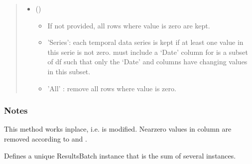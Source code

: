 \documentclass[letterpaper,10pt,english]{sphinxmanual}
\begin{document}
\begin{fulllineitems}
\begin{fulllineitems}
\begin{quote}
\begin{description}
\begin{itemize}
\item {} 
\sphinxAtStartPar
{} (\sphinxstyleliteralemphasis{\sphinxupquote{, }}\sphinxstyleliteralemphasis{\sphinxupquote{, }}) \textendash{} \begin{itemize}
\item {} 
\sphinxAtStartPar
If not provided, all rows where  value is zero are kept.

\item {} 
\sphinxAtStartPar
’Series’: each temporal data series is kept if at least one value in this serie is not zero.
 must include a ‘Date’ column for  is a subset of df such that only the ‘Date’ and  columns
have changing values in this subset.

\item {} 
\sphinxAtStartPar
’All’ : remove all rows where  value is zero.

\end{itemize}


\end{itemize}

\end{description}\end{quote}
\subsubsection*{Notes}

\sphinxAtStartPar
This method works inplace, i.e.  is modified.
Near\sphinxhyphen{}zero values in column  are removed according to  and .

\end{fulllineitems}


\begin{fulllineitems}
\label{\detokenize{generated/tamos.data_IO.ResultsBatch:tamos.data_IO.ResultsBatch.sum}}
\pysigstartsignatures
{}
\pysigstopsignatures
\sphinxAtStartPar
Defines a unique ResultsBatch instance that is the sum of several instances.


\end{fulllineitems}
\end{fulllineitems}
\end{document}
